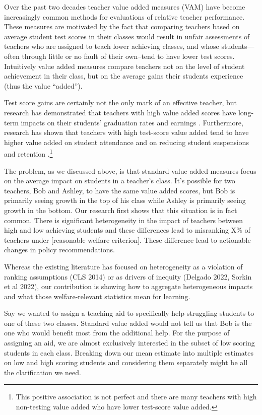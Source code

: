 \documentclass[letterpaper,12pt]{article}
\begin{document}
 Over the past two decades teacher value added measures (VAM) have become increasingly common methods for evaluations of relative teacher performance. These measures are motivated by the fact that comparing teachers based on average student test scores in their classes would result in unfair assessments of teachers who are assigned to teach lower achieving classes, and whose students---often through little or no fault of their own--tend to have lower test scores. Intuitively value added measures compare teachers not on the level of student achievement in their class, but on the average gains their students experience (thus the value ``added'').

Test score gains are certainly not the only mark of an effective teacher, but research has demonstrated that teachers with high value added scores have long-term impacts on their students' graduation rates and earnings \citep{chetty2014measuring2}. Furthermore, research has shown that teachers with high test-score value added tend to have higher value added on student attendance and on reducing student suspensions and retention \citep{pope2017multidimensional}.\footnote{This positive association is not perfect and there are many teachers with high non-testing value added who have lower test-score value added.} 

The problem, as we discussed above, is that standard value added measures focus on the average impact on students in a teacher's class. It’s possible for two teachers, Bob and Ashley, to have the same value added scores, but Bob is primarily seeing growth in the top of his class while Ashley is primarily seeing growth in the bottom. Our research first shows that this situation is in fact common. There is significant heterogeneity in the impact of teachers between high and low achieving students and these differences lead to misranking X\% of teachers under [reasonable welfare criterion]. These difference lead to actionable changes in policy recommendations. 

Whereas the existing literature has focused on heterogeneity as a violation of ranking assumptions (CLS 2014) or as drivers of inequity (Delgado 2022, Sorkin et al 2022), our contribution is showing how to aggregate heterogeneous impacts and what those welfare-relevant statistics mean for learning.

Say we wanted to assign a teaching aid to specifically help struggling students to one of these two classes. Standard value added would not tell us that Bob is the one who would benefit most from the additional help. For the purpose of assigning an aid, we are almost exclusively interested in the subset of low scoring students in each class. Breaking down our mean estimate into multiple estimates on low and high scoring students and considering them separately might be all the clarification we need. 
\end{document}
